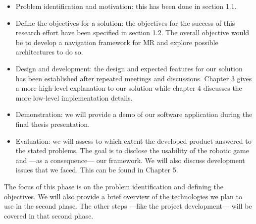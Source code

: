 \begin{itemize}
	\item Problem identification and motivation: this has been done in section 1.1. 
	
	\item Define the objectives for a solution: the objectives for the success of this research effort have been specified in section 1.2. The overall objective would be to develop a navigation framework for MR and explore possible architectures to do so.
	
	\item Design and development: the design and expected features for our solution has been established after repeated meetings and discussions. Chapter 3 gives a more high-level explanation to our solution while chapter 4 discusses the more low-level implementation details.
	
	\item Demonstration: we will provide a demo of our software application during the final thesis presentation.
	
	\item Evaluation: we will assess to which extent the developed product answered to the stated problems. The goal is to disclose the usability of the robotic game and ---as a consequence--- our framework. We will also discuss development issues that we faced. This can be found in Chapter 5.
	

\end{itemize}
The focus of this phase is on the problem identification and defining the objectives. We will also provide a brief overview of the technologies we plan to use in the second phase. The other steps ---like the project development--- will be covered in that second phase.

